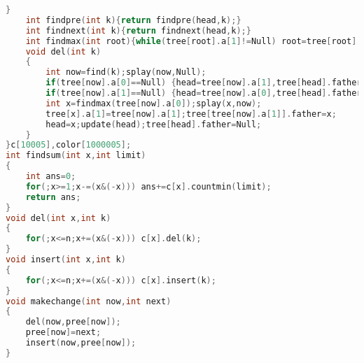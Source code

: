 \begin{lstlisting}[language=c++]
	}
	int findpre(int k){return findpre(head,k);}
	int findnext(int k){return findnext(head,k);}
	int findmax(int root){while(tree[root].a[1]!=Null) root=tree[root].a[1];return root;}
	void del(int k)
	{
		int now=find(k);splay(now,Null);
		if(tree[now].a[0]==Null) {head=tree[now].a[1],tree[head].father=Null;return;}	
		if(tree[now].a[1]==Null) {head=tree[now].a[0],tree[head].father=Null;return;}
		int x=findmax(tree[now].a[0]);splay(x,now);
		tree[x].a[1]=tree[now].a[1];tree[tree[now].a[1]].father=x;
		head=x;update(head);tree[head].father=Null;
	}
}c[10005],color[1000005];
int findsum(int x,int limit)
{
	int ans=0;
	for(;x>=1;x-=(x&(-x))) ans+=c[x].countmin(limit);
	return ans;	
}
void del(int x,int k)
{
	for(;x<=n;x+=(x&(-x))) c[x].del(k);	
}
void insert(int x,int k)
{
	for(;x<=n;x+=(x&(-x))) c[x].insert(k);
}
void makechange(int now,int next)
{
	del(now,pree[now]);
	pree[now]=next;
	insert(now,pree[now]);	
}
    \end{lstlisting}
